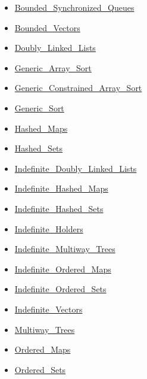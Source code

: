 \begin{scriptsize}
\begin{multicols*}{\columnnr}
\begin{itemize}[leftmargin=0mm]
\begin{itemize}[leftmargin=5mm]
\begin{itemize}[leftmargin=5mm]
	\item[] \href{http://www.ada-auth.org/standards/22rm/html/RM-A-18-29.html}{Bounded\_Synchronized\_Queues}
	\item[] \href{http://www.ada-auth.org/standards/22rm/html/RM-A-18-19.html}{Bounded\_Vectors}
	\item[] \href{http://www.ada-auth.org/standards/22rm/html/RM-A-18-3.html}{Doubly\_Linked\_Lists}
	\item[] \href{http://www.ada-auth.org/standards/22rm/html/RM-A-18-26.html}{Generic\_Array\_Sort}
	\item[] \href{http://www.ada-auth.org/standards/22rm/html/RM-A-18-26.html}{Generic\_Constrained\_Array\_Sort}
	\item[] \href{http://www.ada-auth.org/standards/22rm/html/RM-A-18-26.html}{Generic\_Sort}
	\item[] \href{http://www.ada-auth.org/standards/22rm/html/RM-A-18-5.html}{Hashed\_Maps}
	\item[] \href{http://www.ada-auth.org/standards/22rm/html/RM-A-18-8.html}{Hashed\_Sets}
	\item[] \href{http://www.ada-auth.org/standards/22rm/html/RM-A-18-12.html}{Indefinite\_Doubly\_Linked\_Lists}
	\item[] \href{http://www.ada-auth.org/standards/22rm/html/RM-A-18-13.html}{Indefinite\_Hashed\_Maps}
	\item[] \href{http://www.ada-auth.org/standards/22rm/html/RM-A-18-15.html}{Indefinite\_Hashed\_Sets}
	\item[] \href{http://www.ada-auth.org/standards/22rm/html/RM-A-18-18.html}{Indefinite\_Holders}
	\item[] \href{http://www.ada-auth.org/standards/22rm/html/RM-A-18-17.html}{Indefinite\_Multiway\_Trees}
	\item[] \href{http://www.ada-auth.org/standards/22rm/html/RM-A-18-14.html}{Indefinite\_Ordered\_Maps}
	\item[] \href{http://www.ada-auth.org/standards/22rm/html/RM-A-18-16.html}{Indefinite\_Ordered\_Sets}
	\item[] \href{http://www.ada-auth.org/standards/22rm/html/RM-A-18-11.html}{Indefinite\_Vectors}
	\item[] \href{http://www.ada-auth.org/standards/22rm/html/RM-A-18-10.html}{Multiway\_Trees}
	\item[] \href{http://www.ada-auth.org/standards/22rm/html/RM-A-18-6.html}{Ordered\_Maps}
	\item[] \href{http://www.ada-auth.org/standards/22rm/html/RM-A-18-9.html}{Ordered\_Sets}

\end{itemize}
\end{itemize}
\end{itemize}
\end{multicols*}
\end{scriptsize}
